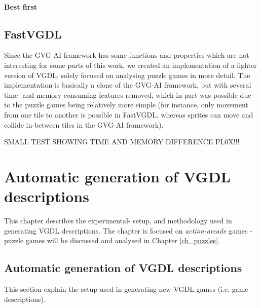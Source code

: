 \documentclass[a4paper,titlepage,final]{report}
\begin{document}
\subsubsection*{Best first}



\section{FastVGDL}
Since the GVG-AI framework has some functions and properties which are not interesting for some parts of this work, we created an implementation of a lighter version of VGDL, solely focused on analysing puzzle games in more detail.
The implementation is basically a clone of the GVG-AI framework, but with several time- and memory consuming features removed, which in part was possible due to the puzzle games being relatively more simple (for instance, only movement from one tile to another is possible in FastVGDL, whereas sprites can move and collide in-between tiles in the GVG-AI framework).

SMALL TEST SHOWING TIME AND MEMORY DIFFERENCE PL0X!!!

 



\chapter{Automatic generation of VGDL descriptions}
This chapter describes the experimental- setup, and methodology used in generating VGDL descriptions.
The chapter is focused on \textit{action-arcade} games - puzzle games will be discussed and analysed in Chapter \ref{ch_puzzles}.


\section{Automatic generation of VGDL descriptions}
This section explain the setup used in generating new VGDL games (i.e. game descriptions).
\end{document}
